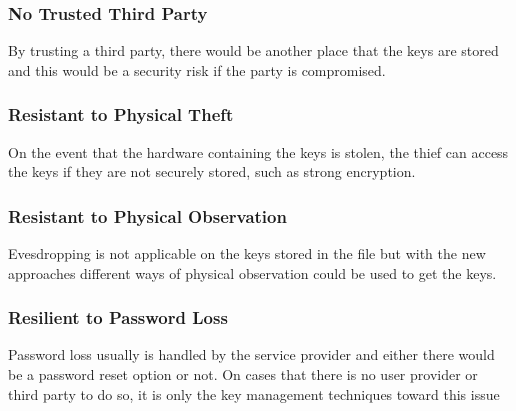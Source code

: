 \subsubsection{No Trusted Third Party}
\label{No Trusted Third Party}
By trusting a third party, there would be another place that the keys are stored and this would be a security risk if the party is compromised.

\subsubsection{Resistant to Physical Theft}
\label{Resistant to Physical Theft}
On the event that the hardware containing the keys is stolen, the thief can access the keys if they are not securely stored, such as strong encryption.

\subsubsection{Resistant to Physical Observation}
\label{Resistant to Physical Observation}
Evesdropping is not applicable on the keys stored in the file but with the new approaches different ways of physical observation could be used to get the keys.

\subsubsection{Resilient to Password Loss}  %
\label{Resilient to Password Loss}
Password loss usually is handled by the service provider and either there would be a password reset option or not. On cases that there is no user provider or third party to do so, it is only the key management techniques toward this issue



